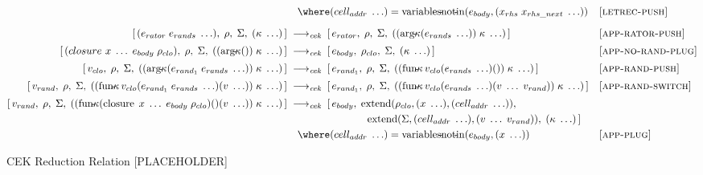 \begin{figure}[!htbp]
{\begin{minipage}{0.93\textwidth}
\begin{align*}
        &\hspace{1em}
          \where (cell_{addr}\;\ldots)=\operatorname{variables\!-\!not\!-\!in}(e_{body},(x_{rhs}\;x_{rhs\_next}\;\ldots))
        &&\textsc{[letrec‑push]}\\[6pt]
%
        [\,(e_{rator}\;e_{rands}\;\ldots),\;\rho,\;\Sigma,\;(\kappa\;\ldots)\,]
        &\;\longrightarrow_{\textit{cek}}\;
        [\,e_{rator},\;\rho,\;\Sigma,\;((\operatorname{arg\!-\!\kappa}(e_{rands}\;\ldots))\;\kappa\;\ldots)\,]
        &&\textsc{[app‑rator‑push]}\\[2pt]
%
        [\,(closure\ x\;\ldots\;e_{body}\;\rho_{clo}),\;\rho,\;\Sigma,\;((\operatorname{arg\!-\!\kappa}())\;\kappa\;\ldots)\,]
        &\;\longrightarrow_{\textit{cek}}\;
        [\,e_{body},\;\rho_{clo},\;\Sigma,\;(\kappa\;\ldots)\,]
        &&\textsc{[app‑no‑rand‑plug]}\\[2pt]
%
        [\,v_{clo},\;\rho,\;\Sigma,\;((\operatorname{arg\!-\!\kappa}(e_{rand_1}\;e_{rands}\;\ldots))\;\kappa\;\ldots)\,]
        &\;\longrightarrow_{\textit{cek}}\;
        [\,e_{rand_1},\;\rho,\;\Sigma,\;((\operatorname{fun\!-\!\kappa}v_{clo}(e_{rands}\;\ldots)())\;\kappa\;\ldots)\,]
        &&\textsc{[app‑rand‑push]}\\[2pt]
%
        [\,v_{rand},\;\rho,\;\Sigma,\;((\operatorname{fun\!-\!\kappa}v_{clo}(e_{rand_1}\;e_{rands}\;\ldots)(v\;\ldots))\;\kappa\;\ldots)\,]
        &\;\longrightarrow_{\textit{cek}}\;
        [\,e_{rand_1},\;\rho,\;\Sigma,\;((\operatorname{fun\!-\!\kappa}v_{clo}(e_{rands}\;\ldots)(v\;\ldots\;v_{rand}))\;\kappa\;\ldots)\,]
        &&\textsc{[app‑rand‑switch]}\\[2pt]
%
        [\,v_{rand},\;\rho,\;\Sigma,\;((\operatorname{fun\!-\!\kappa}
            (\operatorname{closure}\;x\;\ldots\;e_{body}\;\rho_{clo})() (v\;\ldots))\;\kappa\;\ldots)\,]
        &\;\longrightarrow_{\textit{cek}}\;
        [\,e_{body},\;
          \operatorname{extend}(\rho_{clo},(x\;\ldots),(cell_{addr}\;\ldots)),\\
        &\hspace{7.6em}
          \operatorname{extend}(\Sigma,(cell_{addr}\;\ldots),(v\;\ldots\;v_{rand})),\;(\kappa\;\ldots)\,] \\
        &\hspace{1em}
          \where (cell_{addr}\;\ldots)=\operatorname{variables\!-\!not\!-\!in}(e_{body},(x\;\ldots))
        &&\textsc{[app‑plug]}
      \end{align*}
    \end{minipage}%
  }
  \vspace{0.6em}
  \caption{CEK Reduction Relation [PLACEHOLDER]}
  \label{fig:cek-reduction-relation-redacted}
\end{figure}
